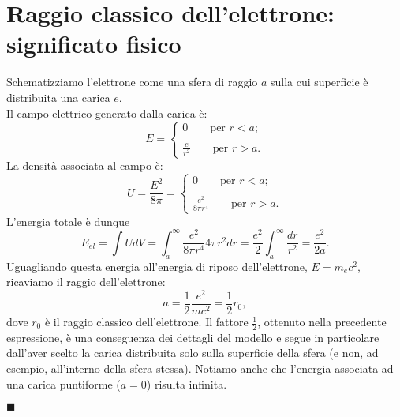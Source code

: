 \section[Raggio classico dell'elettrone]{Raggio classico dell'elettrone: significato fisico}
Schematizziamo l'elettrone come una sfera di raggio $a$ sulla cui superficie è distribuita una carica $e$.\\

Il campo elettrico generato dalla carica è:
\begin{equation}
E=\begin{cases}
0 \qquad \textrm{per }r<a;\\
\\
\displaystyle{\frac{e}{r^2}} \qquad \textrm{per }r>a.
\end{cases}
\end{equation}
La densità associata al campo è:
\begin{equation}
U=\frac{E^2}{8\pi}=\begin{cases}
0 \qquad \textrm{per }r<a;\\
\\
\displaystyle{\frac{e^2}{8\pi r^4}} \qquad \textrm{per }r>a.
\end{cases}
\end{equation}
L'energia totale è dunque
\begin{equation}
E_{el}=\int U dV = \int _a ^{\infty} \frac{e^2}{8\pi r^4} 4\pi r^2 dr = \frac{e^2}{2} \int _a ^{\infty} \frac{dr}{r^2}=\frac{e^2}{2a}. 
\end{equation}
Uguagliando questa energia all'energia di riposo dell'elettrone, $E=m_e c^2$, ricaviamo il raggio dell'elettrone:
\begin{equation}
a=\frac{1}{2}\frac{e^2}{mc^2}=\frac{1}{2} r_0,
\end{equation}
dove $r_0$ è il raggio classico dell'elettrone. Il fattore $\frac{1}{2}$, ottenuto nella precedente espressione, è una conseguenza dei dettagli del modello e segue in particolare dall'aver scelto la carica distribuita solo sulla superficie della sfera (e non, ad esempio, all'interno della sfera stessa). Notiamo anche che l'energia associata ad una carica puntiforme ($a=0$) risulta infinita.
\newpage
\begin{tcolorbox}[sharp corners=downhill,colframe=black, colback=gray!50!white]
\begin{center}
\huge{\textbf{}}
\end{center}
\end{tcolorbox}
$\blacksquare$ \textbf{\large{}}\\

